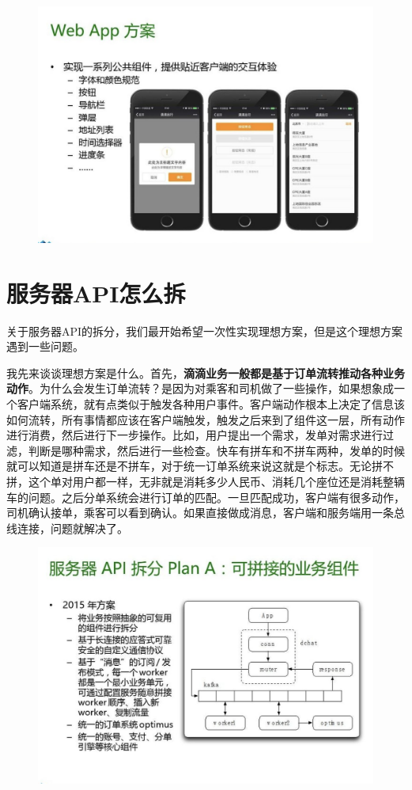 \documentclass[12pt]{article}
\begin{document}
\begin{figure}[H]
    \centering
    \includegraphics[width=1\textwidth]{fig/DIDI_Reconstruction_17.png}
\end{figure}

\section{服务器API怎么拆}
关于服务器API的拆分，我们最开始希望一次性实现理想方案，但是这个理想方案遇到一些问题。

我先来谈谈理想方案是什么。首先，\textbf{滴滴业务一般都是基于订单流转推动各种业务动作}。为什么会发生订单流转？是因为对乘客和司机做了一些操作，如果想象成一个客户端系统，就有点类似于触发各种用户事件。客户端动作根本上决定了信息该如何流转，所有事情都应该在客户端触发，触发之后来到了组件这一层，所有动作进行消费，然后进行下一步操作。比如，用户提出一个需求，发单对需求进行过滤，判断是哪种需求，然后进行一些检查。快车有拼车和不拼车两种，发单的时候就可以知道是拼车还是不拼车，对于统一订单系统来说这就是个标志。无论拼不拼，这个单对用户都一样，无非就是消耗多少人民币、消耗几个座位还是消耗整辆车的问题。之后分单系统会进行订单的匹配。一旦匹配成功，客户端有很多动作，司机确认接单，乘客可以看到确认。如果直接做成消息，客户端和服务端用一条总线连接，问题就解决了。

\begin{figure}[H]
    \centering
    \includegraphics[width=1\textwidth]{fig/DIDI_Reconstruction_18.png}
\end{figure}
\end{document}

